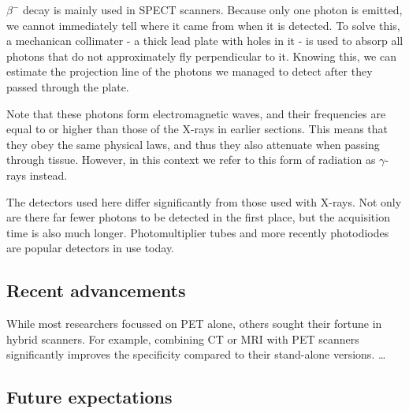 
$\beta^-$ decay is mainly used in SPECT scanners. Because only one photon is
emitted, we cannot immediately tell where it came from when it is detected. To
solve this, a mechanican collimater - a thick lead plate with holes in it - is
used to absorp all photons that do not approximately fly perpendicular to it.
Knowing this, we can estimate the projection line of the photons we managed to
detect after they passed through the plate.

Note that these photons form electromagnetic waves, and their frequencies are
equal to or higher than those of the X-rays in earlier sections. This means that
they obey the same physical laws, and thus they also attenuate when passing
through tissue. However, in this context we refer to this form of radiation as
$\gamma$-rays instead.

The detectors used here differ significantly from those used with X-rays. Not
only are there far fewer photons to be detected in the first place, but the
acquisition time is also much longer. Photomultiplier tubes and more
recently photodiodes are popular detectors in use today.

\subsection{Recent advancements}
While most researchers focussed on PET alone, others sought their fortune in
hybrid scanners. For example, combining CT or MRI with PET scanners significantly
improves the specificity compared to their stand-alone versions. \ldots

\subsection{Future expectations}


